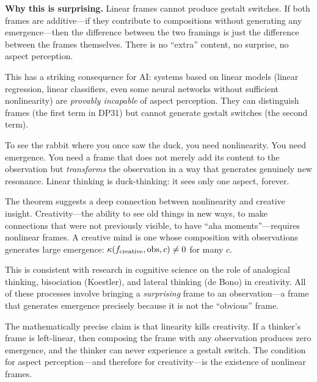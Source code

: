 \begin{surprisebox}
\noindent\textbf{Why this is surprising.}
Linear frames cannot produce gestalt switches.  If both frames are
additive---if they contribute to compositions without generating any
emergence---then the difference between the two framings is just
the difference between the frames themselves.  There is no ``extra''
content, no surprise, no aspect perception.

This has a striking consequence for AI: systems based on linear models
(linear regression, linear classifiers, even some neural networks
without sufficient nonlinearity) are \emph{provably incapable} of
aspect perception.  They can distinguish frames (the first term in DP31)
but cannot generate gestalt switches (the second term).

To see the rabbit where you once saw the duck, you need nonlinearity.
You need emergence.  You need a frame that does not merely add its
content to the observation but \emph{transforms} the observation in a
way that generates genuinely new resonance.  Linear thinking is
duck-thinking: it sees only one aspect, forever.
\end{surprisebox}

\begin{interpretation}
\label{interp:nonlinearity-insight}
The theorem suggests a deep connection between nonlinearity and
creative insight.  Creativity---the ability to see old things in new
ways, to make connections that were not previously visible, to have
``aha moments''---requires nonlinear frames.  A creative mind is one
whose composition with observations generates large emergence:
$\kappa(f_{\mathrm{creative}}, \mathrm{obs}, c) \neq 0$ for many
$c$.

This is consistent with research in cognitive science on the role
of analogical thinking, bisociation (Koestler), and lateral thinking
(de Bono) in creativity.  All of these processes involve bringing
a \emph{surprising} frame to an observation---a frame that generates
emergence precisely because it is not the ``obvious'' frame.

The mathematically precise claim is that linearity kills creativity.
If a thinker's frame is left-linear, then composing the frame with
any observation produces zero emergence, and the thinker can never
experience a gestalt switch.  The condition for aspect perception---and
therefore for creativity---is the existence of nonlinear frames.
\end{interpretation}

